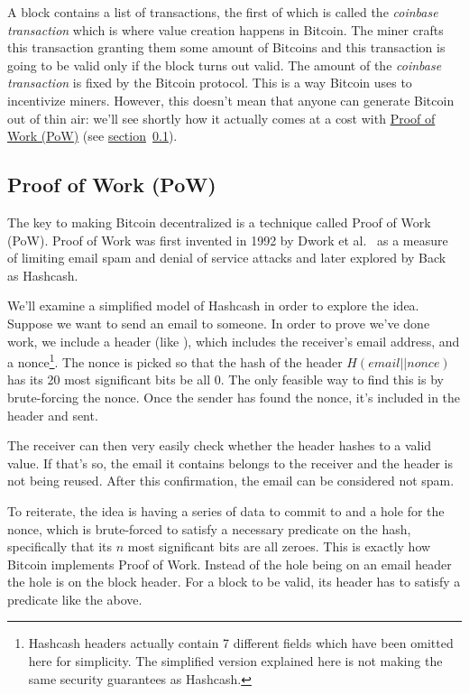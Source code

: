 A block contains a list of transactions, the first of which is called the \emph{coinbase transaction} which is where value creation happens in Bitcoin. The miner crafts this transaction granting them some amount of Bitcoins and this transaction is going to be valid only if the block turns out valid. The amount of the \emph{coinbase transaction} is fixed by the Bitcoin protocol. This is a way Bitcoin uses to incentivize miners. However, this doesn't mean that anyone can generate Bitcoin out of thin air: we'll see shortly how it actually comes at a cost with \hyperref[sec:proofofwork]{Proof of Work (PoW)} (see \hyperref[sec:proofofwork]{section}~\ref{sec:proofofwork}).

\subsection{Proof of Work (PoW)} \label{sec:proofofwork}
The key to making Bitcoin decentralized is a technique called Proof of Work (PoW). Proof of Work was first invented in 1992 by Dwork et al.~\cite{dwork} as a measure of limiting email spam and denial of service attacks and later explored by Back~\cite{hashcash} as Hashcash.

We'll examine a simplified model of Hashcash in order to explore the idea. Suppose we want to send an email to someone. In order to prove we've done work, we include a header (like ), which includes the receiver's email address, and a nonce\footnote{Hashcash headers actually contain 7 different fields which have been omitted here for simplicity. The simplified version explained here is not making the same security guarantees as Hashcash.}. The nonce is picked so that the hash of the header $H(email || nonce)$ has its 20 most significant bits be all 0. The only feasible way to find this is by brute-forcing the nonce. Once the sender has found the nonce, it's included in the header and sent.

The receiver can then very easily check whether the header hashes to a valid value. If that's so, the email it contains belongs to the receiver and the header is not being reused. After this confirmation, the email can be considered not spam.

To reiterate, the idea is having a series of data to commit to and a hole for the nonce, which is brute-forced to satisfy a necessary predicate on the hash, specifically that its $n$ most significant bits are all zeroes. This is exactly how Bitcoin implements Proof of Work. Instead of the hole being on an email header the hole is on the block header. For a block to be valid, its header has to satisfy a predicate like the above.

